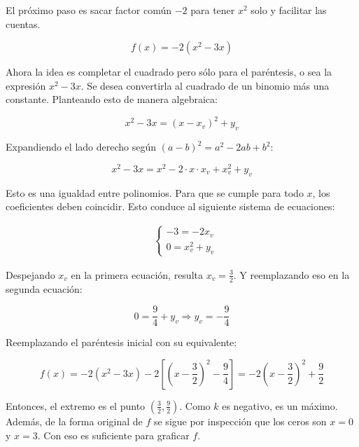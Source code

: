 \documentclass{article}
\begin{document}
El próximo paso es sacar factor común $-2$ para tener $x^2$ solo y facilitar las cuentas.

\begin{equation}
f(x) = -2 (x^2 -3x)
\end{equation}

Ahora la idea es completar el cuadrado pero sólo para el paréntesis, o sea la expresión $x^2 - 3x$. Se desea convertirla al cuadrado de un binomio más una constante. Planteando esto de manera algebraica:

\begin{equation}
x^2 - 3x = (x-x_v)^2 + y_v
\end{equation}

Expandiendo el lado derecho según $(a - b)^2 = a^2 - 2ab +b^2$:

\begin{equation}
x^2 - 3x = x^2 - 2 \cdot x \cdot x_v + x_v^2 + y_v
\end{equation}

Esto es una igualdad entre polinomios. Para que se cumple para todo $x$, los coeficientes deben coincidir. Esto conduce al siguiente sistema de ecuaciones:

\begin{subequations}
\begin{align}
& \left\{ \begin{array}{ll}
-3 = -2 x_v \\
0 = x_v^2 + y_v
\end{array} \right.
\end{align}
\end{subequations}

Despejando $x_v$ en la primera ecuación, resulta $x_v = \frac{3}{2}$. Y reemplazando eso en la segunda ecuación:

\begin{equation}
0 = \frac{9}{4} + y_v \Rightarrow y_v = -\frac{9}{4}
\end{equation}

Reemplazando el paréntesis inicial con su equivalente:

\begin{equation}
f(x) = -2 (x^2 - 3x) -2 \left[ \left(x - \frac{3}{2}\right)^2 - \frac{9}{4} \right] = -2 \left( x -\frac{3}{2} \right)^2 + \frac{9}{2}
\end{equation}

Entonces, el extremo es el punto $\left( \frac{3}{2}, \frac{9}{2} \right)$. Como $k$ es negativo, es un máximo. Además, de la forma original de $f$ se sigue por inspección que los ceros son $x = 0$ y $x = 3$. Con eso es suficiente para graficar $f$.
\end{document}
